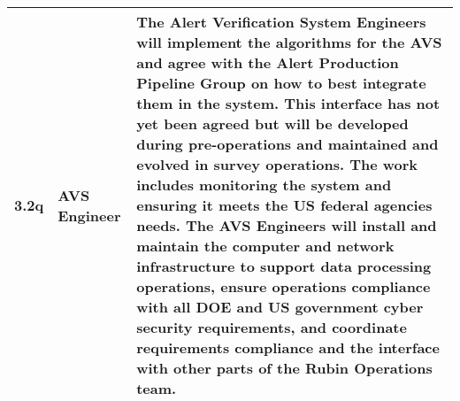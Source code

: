 \begin{longtable} {|p{}|p{}|p{}|}
{3.2q}&{AVS Engineer}&{The Alert Verification System Engineers will implement the algorithms for the AVS and agree with the Alert Production Pipeline Group on how to best integrate them in the system. This interface has not yet been agreed but will be developed during pre-operations and maintained and evolved in survey operations. The work includes monitoring the system and ensuring it meets the US federal agencies needs. The AVS Engineers will install and maintain the computer and network infrastructure to support data processing operations, ensure operations compliance with all DOE and US government cyber security requirements, and coordinate requirements compliance and the interface with other parts of the Rubin Operations team.} \\ \hline
\end{longtable} \normalsize
